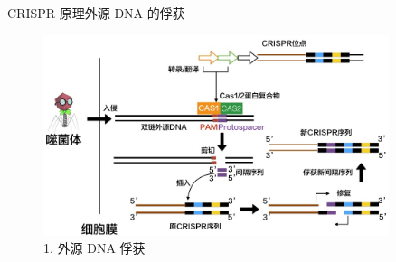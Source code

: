 \documentclass{beamer}
\begin{document}
\begin{frame}{CRISPR 原理}{外源 DNA 的俘获}
		
	\begin{figure}
		\centering
		\includegraphics[width=0.9\textwidth]{img/infect_stage1.jpeg}
		\caption{1. 外源 DNA 俘获}
	\end{figure}






\end{frame}

\end{document}
